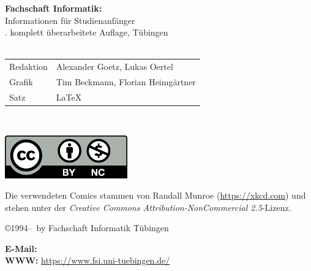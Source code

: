 \thispagestyle{empty}

\textbf{Fachschaft Informatik:}\\
Informationen für Studienanfänger\\
\number\auflage. komplett überarbeitete Auf\/lage, Tübingen \number\jahr\\[1cm]
\medskip \\

\begin{tabular}{ll}
	Redaktion & Alexander Goetz, Lukas Oertel\\ %
	Grafik & Tim Beckmann, Florian Heimgärtner \\
	Satz & \LaTeX
\end{tabular}\\

\vfill
\begin{minipage}[c]{0.1\textwidth}
	\includegraphics[width=\linewidth]{info/logos/by-nc.pdf}
\end{minipage}
\begin{minipage}[c]{0.9\textwidth}
Die verwendeten Comics stammen von Randall Munroe (\url{https://xkcd.com}) und stehen unter der \emph{Creative Commons Attribution-NonCommercial 2.5}-Lizenz. 
\end{minipage}

\copyright 1994--\number\jahr ~by Fachschaft Informatik Tübingen\\

\medskip

\textbf{E-Mail:} \hfill
{}\\
\textbf{WWW:} \hfill
\url{https://www.fsi.uni-tuebingen.de/}
\newpage
